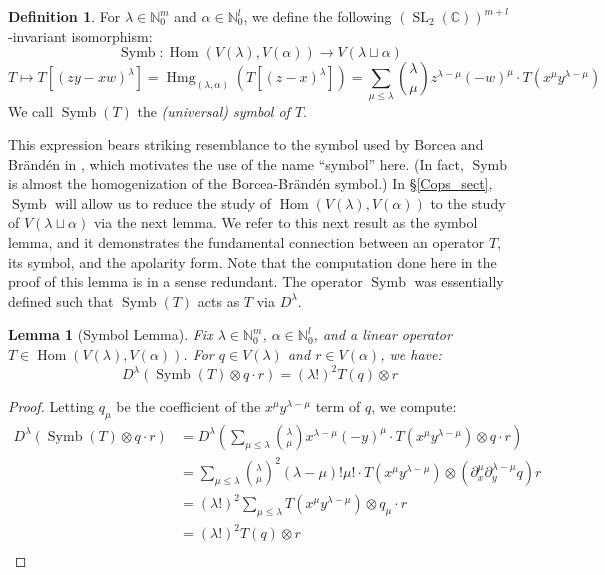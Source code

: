 \documentclass{article}
\newtheorem{lemma}[theorem]{Lemma}
\theoremstyle{definition}
\newtheorem{definition}[theorem]{Definition}
\theoremstyle{plain}
\newcommand{\C}{\mathbb{C}}
\newcommand{\N}{\mathbb{N}}
\DeclareMathOperator{\Hmg}{Hmg}
\DeclareMathOperator{\Symb}{Symb}
\DeclareMathOperator{\Hom}{Hom}
\DeclareMathOperator{\SL}{SL}
\begin{document}
\begin{definition}\label{symb_def}
    For $\lambda \in \N_0^m$ and $\alpha \in \N_0^l$, we define the following $(\SL_2(\C))^{m+l}$-invariant isomorphism:
    \[
        \Symb: \Hom(V(\lambda),V(\alpha)) \rightarrow V(\lambda \sqcup \alpha)
    \]
    \[
        T \mapsto T\left[(zy-xw)^\lambda\right] = \Hmg_{(\lambda,\alpha)}\left(T[(z-x)^\lambda]\right) = \sum_{\mu \leq \lambda} \binom{\lambda}{\mu} z^{\lambda-\mu} (-w)^{\mu} \cdot T(x^\mu y^{\lambda-\mu})
    \]
    We call $\Symb(T)$ the \emph{(universal) symbol of $T$}. 
\end{definition}

This expression bears striking resemblance to the symbol used by Borcea and Br{\"a}nd{\'e}n in \cite{bb1}, which motivates the use of the name ``symbol'' here. (In fact, $\Symb$ is almost the homogenization of the Borcea-Br{\"a}nd{\'e}n symbol.) In \S\ref{Cops_sect}, $\Symb$ will allow us to reduce the study of $\Hom(V(\lambda),V(\alpha))$ to the study of $V(\lambda \sqcup \alpha)$ via the next lemma. We refer to this next result as the symbol lemma, and it demonstrates the fundamental connection between an operator $T$, its symbol, and the apolarity form. Note that the computation done here in the proof of this lemma is in a sense redundant. The operator $\Symb$ was essentially defined such that $\Symb(T)$ acts as $T$ via $D^\lambda$.

\begin{lemma}[Symbol Lemma]\label{symb_lemma}
    Fix $\lambda \in \N_0^m$, $\alpha \in \N_0^l$, and a linear operator $T \in \Hom(V(\lambda),V(\alpha))$. For $q \in V(\lambda)$ and $r \in V(\alpha)$, we have:
    \[
        D^\lambda(\Symb(T) \otimes q \cdot r) = (\lambda!)^2 T(q) \otimes r
    \]
\end{lemma}
\begin{proof}
    Letting $q_\mu$ be the coefficient of the $x^\mu y^{\lambda-\mu}$ term of $q$, we compute:
    \[
        \begin{split}
            D^\lambda(\Symb(T) \otimes q \cdot r) &= D^\lambda \left(\sum_{\mu \leq \lambda} \binom{\lambda}{\mu} x^{\lambda-\mu} (-y)^{\mu} \cdot T(x^\mu y^{\lambda-\mu}) \otimes q \cdot r\right) \\
                &= \sum_{\mu \leq \lambda} \binom{\lambda}{\mu}^2 (\lambda-\mu)! \mu! \cdot T(x^\mu y^{\lambda-\mu}) \otimes (\partial_x^\mu \partial_y^{\lambda-\mu} q) r \\
                &= (\lambda!)^2 \sum_{\mu \leq \lambda} T(x^\mu y^{\lambda-\mu}) \otimes q_\mu \cdot r \\
                &= (\lambda!)^2 T(q) \otimes r \\
        \end{split}
    \]
\end{proof}
\end{document}
